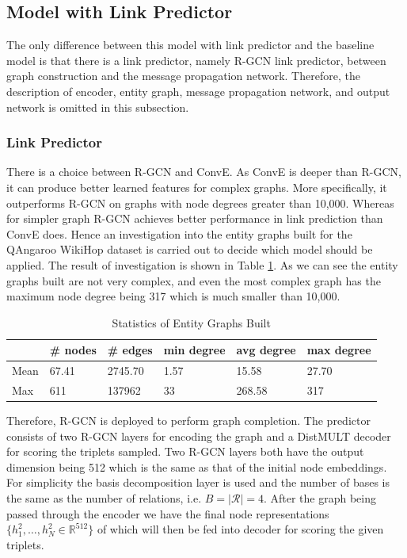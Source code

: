 \documentclass[12pt]{report}
\begin{document}
\subsection{Model with Link Predictor}
The only difference between this model with link predictor and the baseline model is that there is a link predictor, namely R-GCN link predictor, between graph construction and the message propagation network. Therefore, the description of encoder, entity graph, message propagation network, and output network is omitted in this subsection.

\subsubsection{Link Predictor}
There is a choice between R-GCN and ConvE. As ConvE is deeper than R-GCN, it can produce better learned features for complex graphs. More specifically, it outperforms R-GCN on graphs with node degrees greater than 10,000. Whereas for simpler graph R-GCN achieves better performance in link prediction than ConvE does. Hence an investigation into the entity graphs built for the QAngaroo WikiHop dataset is carried out to decide which model should be applied. The result of investigation is shown in Table \ref{graph_stat}. As we can see the entity graphs built are not very complex, and even the most complex graph has the maximum node degree
being 317 which is much smaller than 10,000.\begin{table}[H]
\center
\caption{Statistics of Entity Graphs Built}
\label{graph_stat}
\begin{tabular}{l|lllll}
     & \# nodes & \# edges & min degree & avg degree & max degree \\ \hline
Mean & 67.41    & 2745.70  & 1.57       & 15.58      & 27.70      \\
Max  & 611      & 137962   & 33         & 268.58     & 317       
\end{tabular}
\end{table}

Therefore, R-GCN is deployed to perform graph completion. The predictor consists of two R-GCN layers for encoding the graph and a DistMULT decoder for scoring the triplets sampled. Two R-GCN layers both have the output dimension being 512 which is the same as that of the initial node embeddings. For simplicity the basis decomposition
layer is used and the number of bases is the same as the number of relations, i.e. $B=|\mathcal{R}|=4$. After the graph being passed through the encoder we have the final node representations $\{h_1^2, \dots,h_N^2\in\mathbb{R}^{512}\}$ of which will then be fed into decoder for scoring the given triplets.
\end{document}
